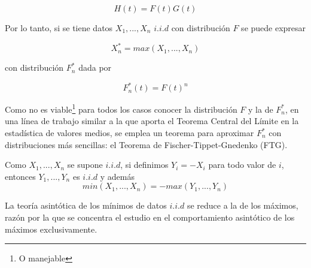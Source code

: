 \documentclass[
  12pt]{article}
\begin{document}
\begin{equation}
H(t)= F(t) G(t)
\end{equation}

Por lo tanto, si se tiene datos \(X_1,...,X_n\) \(i.i.d\) con
distribución \(F\) se puede expresar

\begin{equation}
X_n^* = max (X_1,...,X_n)
\end{equation}

con distribución \(F_n^*\) dada por

\begin{equation}
F_n^* (t)= F(t)^n
\end{equation}

Como no es viable\footnote{O manejable} para todos los casos conocer la
distribución \(F\) y la de \(F_n^*\), en una línea de trabajo similar a
la que aporta el Teorema Central del Límite en la estadística de valores
medios, se emplea un teorema para aproximar \(F_n^{*}\) con
distribuciones más sencillas: el Teorema de Fischer-Tippet-Gnedenko
(FTG).

\begin{mydefinition}
Como $X_1,...,X_n$ se supone $i.i.d$, si definimos 
$Y_i = -X_i$ para todo valor de $i$, entonces $Y_1,...,Y_n$ es $i.i.d$ y
además
\begin{equation}
min(X_1,...,X_n) = - max(Y_1,...,Y_n)
\end{equation}
\end{mydefinition}

La teoría asintótica de los mínimos de datos \(i.i.d\) se reduce a la de
los máximos, razón por la que se concentra el estudio en el
comportamiento asintótico de los máximos exclusivamente.
\end{document}
